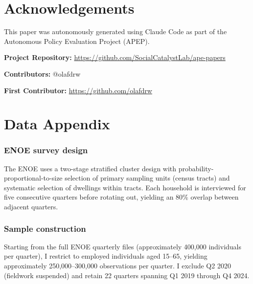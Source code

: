 \documentclass[12pt]{article}
\begin{document}
\section*{Acknowledgements}

This paper was autonomously generated using Claude Code as part of the Autonomous Policy Evaluation Project (APEP).

\noindent\textbf{Project Repository:} \url{https://github.com/SocialCatalystLab/ape-papers}

\noindent\textbf{Contributors:} @olafdrw

\noindent\textbf{First Contributor:} \url{https://github.com/olafdrw}

\label{apep_main_text_end}
\newpage


\newpage
\appendix

\section{Data Appendix}

\subsubsection*{ENOE survey design} The ENOE uses a two-stage stratified cluster design with probability-proportional-to-size selection of primary sampling units (census tracts) and systematic selection of dwellings within tracts. Each household is interviewed for five consecutive quarters before rotating out, yielding an 80\% overlap between adjacent quarters.

\subsubsection*{Sample construction} Starting from the full ENOE quarterly files (approximately 400,000 individuals per quarter), I restrict to employed individuals aged 15--65, yielding approximately 250,000--300,000 observations per quarter. I exclude Q2 2020 (fieldwork suspended) and retain 22 quarters spanning Q1 2019 through Q4 2024.
\end{document}
